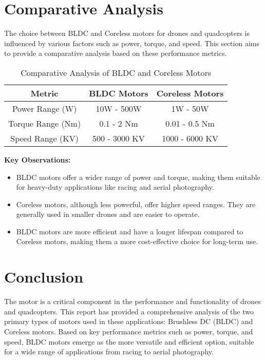 \documentclass[12pt]{article}
\begin{document}
	\section{Comparative Analysis}
	
	The choice between BLDC and Coreless motors for drones and quadcopters is influenced by various factors such as power, torque, and speed. This section aims to provide a comparative analysis based on these performance metrics.
	
	\begin{table}[h]
		\centering
		\caption{Comparative Analysis of BLDC and Coreless Motors}
		\begin{tabular}{|c|c|c|}
			\hline
			Metric & BLDC Motors & Coreless Motors \\
			\hline
			Power Range (W) & 10W - 500W & 1W - 50W \\
			\hline
			Torque Range (Nm) & 0.1 - 2 Nm & 0.01 - 0.5 Nm \\
			\hline
			Speed Range (KV) & 500 - 3000 KV & 1000 - 6000 KV \\
			\hline
		\end{tabular}
	\end{table}
	
	\textbf{Key Observations:}
	\begin{itemize}
		\item BLDC motors offer a wider range of power and torque, making them suitable for heavy-duty applications like racing and aerial photography.
		
		\item Coreless motors, although less powerful, offer higher speed ranges. They are generally used in smaller drones and are easier to operate.
		
		\item BLDC motors are more efficient and have a longer lifespan compared to Coreless motors, making them a more cost-effective choice for long-term use.
	\end{itemize}
	
	\section{Conclusion}
	
	The motor is a critical component in the performance and functionality of drones and quadcopters. This report has provided a comprehensive analysis of the two primary types of motors used in these applications: Brushless DC (BLDC) and Coreless motors. Based on key performance metrics such as power, torque, and speed, BLDC motors emerge as the more versatile and efficient option, suitable for a wide range of applications from racing to aerial photography.
	
\end{document}
